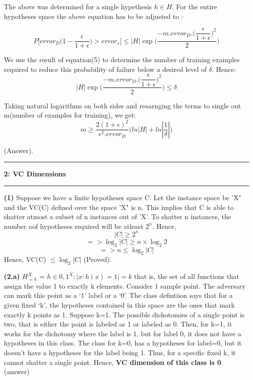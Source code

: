 \documentclass{article}
\newcommand\question[2]{\vspace{.25in}\hrule\textbf{#1: #2}\hrule\vspace{.10in}}
\renewcommand\part[1]{\vspace{.10in}\textbf{(#1)}}
\begin{document}
    The above was determined for a single hypethesis $h \in H$. For the entire hypotheses space the above equation has to be adjusted to :
    
    \begin{equation}
    P\bigg [  error_{D}\bigg (  1 - \dfrac{\epsilon}{1 + \epsilon}  \bigg ) > error_{s}  \bigg ] \leq |H|\exp \bigg (\dfrac{-m.error_{D}.\bigg (\dfrac{\epsilon}{1 + \epsilon}\bigg )^2}{2}\bigg )
    \end{equation}
    
    We use the result of equation(5) to determine the number of training examples required to reduce this probability of failure below a desired level of $\delta$. Hence: \newline
    \[ |H|\exp \bigg (\dfrac{-m.error_{D}.\bigg (\dfrac{\epsilon}{1 + \epsilon}\bigg )^2}{2}\bigg ) \leq \delta \]
    
    Taking natural logarithms on both sides and reaarnging the terms to single out m(number of examples for training), we get: \newline
    \begin{equation}
      m \geq \dfrac{2(1 + \epsilon)^2}{\epsilon^2 . error_{D}}\bigg (  ln|H| + ln|\dfrac{1}{\delta}| \bigg )
    \end{equation}
    
    (Answer).
  
  \question{2}{VC Dimensions}
  \part{1} Suppose we have a finite hypotheses space C. Let the instance space be 'X"  and the VC(C) defined over the space 'X" is n. This implies that C is able to shatter atmost a subset of n instances out of 'X'. To shatter n instances, the number oof hypotheses required will be atleast $2^n$. Hence, \newline
  \[|C| \geq 2^n\]
  \[=> \log_{2}|C| \geq n \times \log_{2}2\]
  \[=> n \leq \log_{2}|C| \]
  Hence, VC(C) $\leq \log_{2}|C|$ (Proved). \newline
  
  \part{2.a} 
    $H_{=k}^X$ = ${h \in {0,1}^X : |{x:h(x)=1}| = k}$
    that is, the set of all functions that assign the value 1 to exactly k elements.
    Consider 1 sample point. The adversary can mark this point as a `1' label or a `0'. The class defintiion says that for a given fixed `k', the hypotheses contained in this space are the ones that mark exactly k points as 1. Suppose k=1. The possible dichotomies of a single point is two, that is either the point is labeled as 1 or labeled as 0. Then, for k=1, it works for the dichotomy where the label is 1, but for label 0, it does not have a hypotheses in this class. The class for k=0, has a hypotheses for label=0, but it doesn't havs a hypotheses for the label being 1. Thus, for a specific fixed k, it cannot shatter a single point. Hence, \textbf { VC dimension of this class is 0}. (answer) \newline
    
\end{document}
